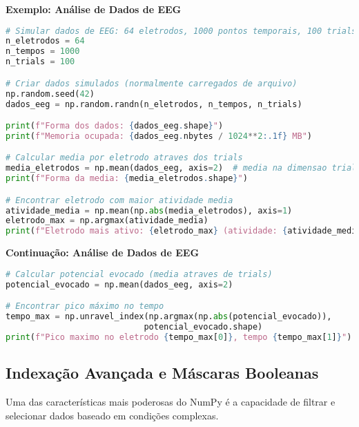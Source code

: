 \begin{researchbox}
\textbf{Exemplo: Análise de Dados de EEG}

\begin{lstlisting}[language=Python]
# Simular dados de EEG: 64 eletrodos, 1000 pontos temporais, 100 trials
n_eletrodos = 64
n_tempos = 1000
n_trials = 100

# Criar dados simulados (normalmente carregados de arquivo)
np.random.seed(42)
dados_eeg = np.random.randn(n_eletrodos, n_tempos, n_trials)

print(f"Forma dos dados: {dados_eeg.shape}")
print(f"Memoria ocupada: {dados_eeg.nbytes / 1024**2:.1f} MB")

# Calcular media por eletrodo atraves dos trials
media_eletrodos = np.mean(dados_eeg, axis=2)  # media na dimensao trials
print(f"Forma da media: {media_eletrodos.shape}")

# Encontrar eletrodo com maior atividade media
atividade_media = np.mean(np.abs(media_eletrodos), axis=1)
eletrodo_max = np.argmax(atividade_media)
print(f"Eletrodo mais ativo: {eletrodo_max} (atividade: {atividade_media[eletrodo_max]:.3f})")
\end{lstlisting}
\end{researchbox}

\begin{researchbox}
\textbf{Continuação: Análise de Dados de EEG}

\begin{lstlisting}[language=Python]
# Calcular potencial evocado (media atraves de trials)
potencial_evocado = np.mean(dados_eeg, axis=2)

# Encontrar pico máximo no tempo
tempo_max = np.unravel_index(np.argmax(np.abs(potencial_evocado)), 
                            potencial_evocado.shape)
print(f"Pico maximo no eletrodo {tempo_max[0]}, tempo {tempo_max[1]}")
\end{lstlisting}
\end{researchbox}

\subsection{Indexação Avançada e Máscaras Booleanas}

Uma das características mais poderosas do NumPy é a capacidade de filtrar e selecionar dados baseado em condições complexas.

